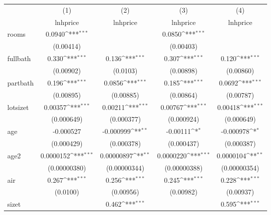 {
\def\sym#1{\ifmmode^{#1}\else\(^{#1}\)\fi}
\begin{tabular}{l*{4}{c}}
\hline\hline
            &\multicolumn{1}{c}{(1)}&\multicolumn{1}{c}{(2)}&\multicolumn{1}{c}{(3)}&\multicolumn{1}{c}{(4)}\\
            &\multicolumn{1}{c}{lnhprice}&\multicolumn{1}{c}{lnhprice}&\multicolumn{1}{c}{lnhprice}&\multicolumn{1}{c}{lnhprice}\\
\hline
rooms       &      0.0940\sym{***}&                     &      0.0850\sym{***}&                     \\
            &   (0.00414)         &                     &   (0.00403)         &                     \\
[1em]
fullbath    &       0.330\sym{***}&       0.136\sym{***}&       0.307\sym{***}&       0.120\sym{***}\\
            &   (0.00902)         &    (0.0103)         &   (0.00898)         &   (0.00860)         \\
[1em]
partbath    &       0.196\sym{***}&      0.0856\sym{***}&       0.185\sym{***}&      0.0692\sym{***}\\
            &   (0.00895)         &   (0.00885)         &   (0.00864)         &   (0.00787)         \\
[1em]
lotsizet    &     0.00357\sym{***}&     0.00211\sym{***}&     0.00767\sym{***}&     0.00418\sym{***}\\
            &  (0.000649)         &  (0.000377)         &  (0.000924)         &  (0.000649)         \\
[1em]
age         &   -0.000527         &   -0.000999\sym{**} &    -0.00111\sym{*}  &   -0.000978\sym{*}  \\
            &  (0.000429)         &  (0.000378)         &  (0.000437)         &  (0.000387)         \\
[1em]
age2        &   0.0000152\sym{***}&  0.00000897\sym{**} &   0.0000220\sym{***}&   0.0000104\sym{**} \\
            &(0.00000380)         &(0.00000344)         &(0.00000388)         &(0.00000354)         \\
[1em]
air         &       0.267\sym{***}&       0.256\sym{***}&       0.245\sym{***}&       0.228\sym{***}\\
            &    (0.0100)         &   (0.00956)         &   (0.00982)         &   (0.00937)         \\
[1em]
sizet       &                     &       0.462\sym{***}&                     &       0.595\sym{***}\\

\end{tabular}}

